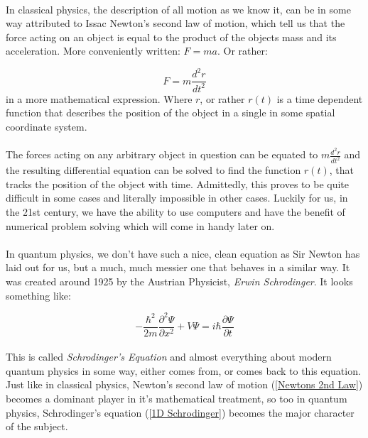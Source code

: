 \documentclass[12pt,letterpaper]{book}
\begin{document}
\paragraph*{}In classical physics, the description of all motion as we know it, can be in some way attributed to Issac Newton's second law of motion, which tell us that the force acting on an object is equal to the product of the objects mass and its acceleration. More conveniently written: $F = ma$. Or rather:

\begin{equation}
\label{Newtons 2nd Law}
F = m\frac{d^2r}{dt^2}
\end{equation} 
in a more mathematical expression. Where $r$, or rather $r(t)$ is a time dependent function that describes the position of the object in a single in some spatial coordinate system.

\paragraph*{}The forces acting on any arbitrary object in question can be equated to $m\frac{d^2r}{dt^2}$ and the resulting differential equation can be solved to find the function $r(t)$, that tracks the position of the object with time. Admittedly, this proves to be quite difficult in some cases and literally impossible in other cases. Luckily for us, in the 21st century, we have the ability to use computers and have the benefit of numerical problem solving which will come in handy later on.

\paragraph*{}In quantum physics, we don't have such a nice, clean equation as Sir Newton has laid out for us, but a much, much messier one that behaves in a similar way. It was created around 1925 by the Austrian Physicist, \textit{Erwin Schrodinger}. It looks something like:

\begin{equation}
\label{1D Schrodinger}
-\frac{\hbar^2}{2m}\frac{\partial^2\Psi}{\partial x^2} +
V\Psi = i\hbar\frac{\partial \Psi}{\partial t}
\end{equation}

\paragraph*{}This is called \textit{Schrodinger's Equation} and almost everything about modern quantum physics in some way, either comes from, or comes back to this equation. Just like in classical physics, Newton's second law of motion (\ref{Newtons 2nd Law}) becomes a dominant player in it's mathematical treatment, so too in quantum physics, Schrodinger's equation (\ref{1D Schrodinger}) becomes the major character of the subject.
\end{document}
